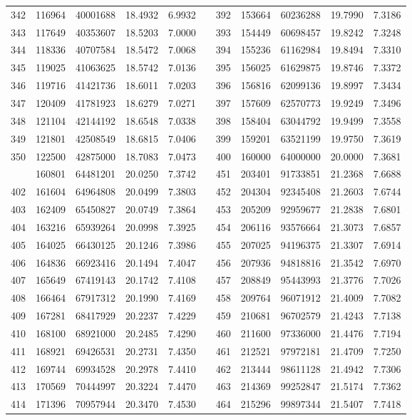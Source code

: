 \begin{longtable}{rrrrrrrrrrr}
342&116964&40001688&18.4932&6.9932&&392&153664&60236288&19.7990&7.3186\\
343&117649&40353607&18.5203&7.0000&&393&154449&60698457&19.8242&7.3248\\
344&118336&40707584&18.5472&7.0068&&394&155236&61162984&19.8494&7.3310\\
345&119025&41063625&18.5742&7.0136&&395&156025&61629875&19.8746&7.3372\\
346&119716&41421736&18.6011&7.0203&&396&156816&62099136&19.8997&7.3434\\
347&120409&41781923&18.6279&7.0271&&397&157609&62570773&19.9249&7.3496\\
348&121104&42144192&18.6548&7.0338&&398&158404&63044792&19.9499&7.3558\\
349&121801&42508549&18.6815&7.0406&&399&159201&63521199&19.9750&7.3619\\
350&122500&42875000&18.7083&7.0473&&400&160000&64000000&20.0000&7.3681\\
\newpage
401&160801&64481201&20.0250&7.3742&&451&203401&91733851&21.2368&7.6688\\
402&161604&64964808&20.0499&7.3803&&452&204304&92345408&21.2603&7.6744\\
403&162409&65450827&20.0749&7.3864&&453&205209&92959677&21.2838&7.6801\\
404&163216&65939264&20.0998&7.3925&&454&206116&93576664&21.3073&7.6857\\
405&164025&66430125&20.1246&7.3986&&455&207025&94196375&21.3307&7.6914\\
406&164836&66923416&20.1494&7.4047&&456&207936&94818816&21.3542&7.6970\\
407&165649&67419143&20.1742&7.4108&&457&208849&95443993&21.3776&7.7026\\
408&166464&67917312&20.1990&7.4169&&458&209764&96071912&21.4009&7.7082\\
409&167281&68417929&20.2237&7.4229&&459&210681&96702579&21.4243&7.7138\\
410&168100&68921000&20.2485&7.4290&&460&211600&97336000&21.4476&7.7194\\
411&168921&69426531&20.2731&7.4350&&461&212521&97972181&21.4709&7.7250\\
412&169744&69934528&20.2978&7.4410&&462&213444&98611128&21.4942&7.7306\\
413&170569&70444997&20.3224&7.4470&&463&214369&99252847&21.5174&7.7362\\
414&171396&70957944&20.3470&7.4530&&464&215296&99897344&21.5407&7.7418\\

\end{longtable}

